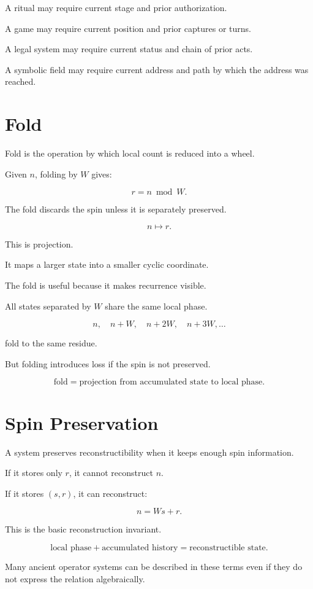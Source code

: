 \documentclass[11pt]{book}
\begin{document}
A ritual may require current stage and prior authorization.

A game may require current position and prior captures or turns.

A legal system may require current status and chain of prior acts.

A symbolic field may require current address and path by which the address was reached.

\section{Fold}

Fold is the operation by which local count is reduced into a wheel.

Given \(n\), folding by \(W\) gives:

\[
r = n \bmod W.
\]

The fold discards the spin unless it is separately preserved.

\[
n \mapsto r.
\]

This is projection.

It maps a larger state into a smaller cyclic coordinate.

The fold is useful because it makes recurrence visible.

All states separated by \(W\) share the same local phase.

\[
n,\quad n+W,\quad n+2W,\quad n+3W,\ldots
\]

fold to the same residue.

But folding introduces loss if the spin is not preserved.

\[
\text{fold} = \text{projection from accumulated state to local phase}.
\]

\section{Spin Preservation}

A system preserves reconstructibility when it keeps enough spin information.

If it stores only \(r\), it cannot reconstruct \(n\).

If it stores \((s,r)\), it can reconstruct:

\[
n = Ws + r.
\]

This is the basic reconstruction invariant.

\[
\text{local phase} + \text{accumulated history} = \text{reconstructible state}.
\]

Many ancient operator systems can be described in these terms even if they do not express the relation algebraically.
\end{document}
